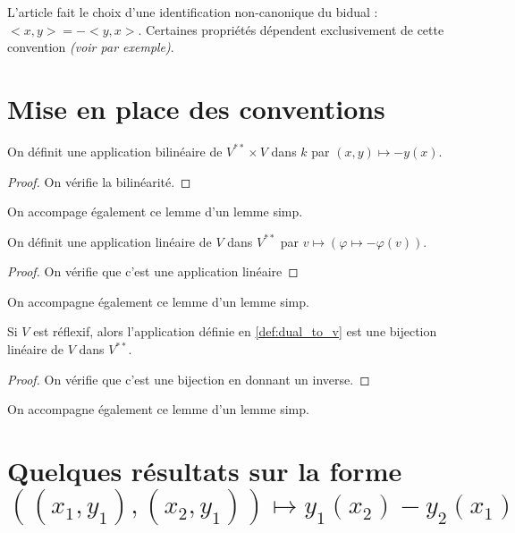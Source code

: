 L'article fait le choix d'une identification non-canonique du bidual :
$<x,y>=-<y,x>$. Certaines propriétés dépendent exclusivement de cette
convention \textit{(voir par exemple)}.

\section{Mise en place des conventions}

\begin{definition}
    \label{def:form_dual}
    \uses{}
    \leanok 

    On définit une application bilinéaire de $V^{**}\times V$ dans $k$ par 
    $(x,y)\mapsto - y(x)$.
    \begin{proof}
        \leanok
        On vérifie la bilinéarité.
    \end{proof}
\end{definition}
On accompage également ce lemme d'un lemme simp.

\begin{definition}
    \label{def:v_to_dual_dual}
    \uses{}
    \leanok 

    On définit une application linéaire de $V$ dans $V^{**}$ par 
    $v\mapsto (\varphi\mapsto -\varphi(v))$.
    \begin{proof}
        \leanok
        On vérifie que c'est une application linéaire
    \end{proof}
\end{definition}
On accompagne également ce lemme d'un lemme simp.

\begin{proposition}
    \label{def:identification_dual}
    \leanok 

    Si $V$ est réflexif, alors l'application définie en \ref{def:dual_to_v} est une 
    bijection linéaire de $V$ dans $V^{**}$.
    \begin{proof}
        \leanok
        On vérifie que c'est une bijection en donnant un inverse.
    \end{proof}
\end{proposition}
On accompagne également ce lemme d'un lemme simp.

\section{Quelques résultats sur la forme $((x_1,y_1),(x_2,y_1))\mapsto y_1(x_2)-y_2(x_1)$}

